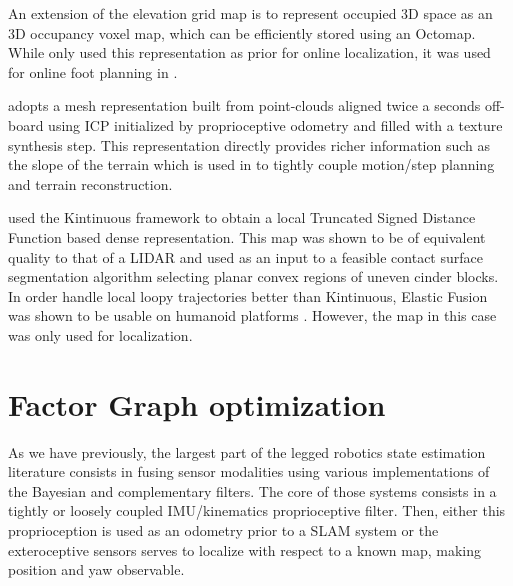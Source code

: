 An extension of the elevation grid map is to represent occupied 3D space as an 3D occupancy voxel map, which can be efficiently stored using an Octomap.
While \cite{hornung2014monte, fallon2014drift} only used this representation as prior for online localization, it was used for online foot planning in \cite{winkler2015planning, mastalli2015line}. 

\cite{kolter2009stereo} adopts a mesh representation built from point-clouds aligned twice a seconds off-board using ICP initialized by proprioceptive odometry and filled with
a texture synthesis step. This representation directly provides richer information such as the slope of the terrain which is used in \cite{mastalli2020motion} to 
tightly couple motion/step planning and terrain reconstruction.

\cite{fallon2015continuous} used the Kintinuous framework \cite{whelan2012kintinuous} to obtain a local Truncated Signed Distance Function based dense representation. This map was
shown to be of equivalent quality to that of a LIDAR and used as an input to a feasible contact surface segmentation algorithm selecting planar convex regions of uneven cinder blocks. 
In order handle local loopy trajectories better than Kintinuous, Elastic Fusion \cite{whelan2016elasticfusion} was shown to be usable on humanoid platforms \cite{scona2017direct}. 
However, the map in this case was only used for localization.




\section{Factor Graph optimization}

As we have previously, the largest part of the legged robotics state estimation literature consists in fusing sensor modalities using various 
implementations of the Bayesian and complementary filters. The core of those systems consists in a tightly or loosely coupled IMU/kinematics proprioceptive
filter. Then, either this proprioception is used as an odometry prior to a SLAM system or the exteroceptive sensors serves to localize with respect to a known map,
making position and yaw observable.

